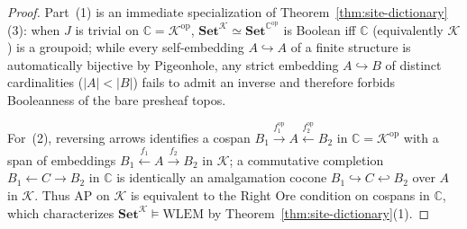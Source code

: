 \documentclass[10pt,twoside,openright]{book}
\theoremstyle{crmplain}
\theoremstyle{crmdef}
\theoremstyle{crmremark}
\begin{document}
\begin{proof}
Part~(1) is an immediate specialization of Theorem~\ref{thm:site-dictionary}(3): when $J$ is trivial on $\mathbb{C} = \mathcal{K}^{\mathrm{op}}$, $\mathbf{Set}^{\mathcal{K}} \simeq \mathbf{Set}^{\mathbb{C}^{\mathrm{op}}}$ is Boolean iff $\mathbb{C}$ (equivalently $\mathcal{K}$) is a groupoid; while every self-embedding $A \hookrightarrow A$ of a finite structure is automatically bijective by Pigeonhole, any strict embedding $A \hookrightarrow B$ of distinct cardinalities ($|A| < |B|$) fails to admit an inverse and therefore forbids Booleanness of the bare presheaf topos.

For~(2), reversing arrows identifies a cospan $B_1 \xrightarrow{f_1^{\mathrm{op}}} A \xleftarrow{f_2^{\mathrm{op}}} B_2$ in $\mathbb{C} = \mathcal{K}^{\mathrm{op}}$ with a span of embeddings $B_1 \xleftarrow{f_1} A \xrightarrow{f_2} B_2$ in $\mathcal{K}$; a commutative completion $B_1 \leftarrow C \rightarrow B_2$ in $\mathbb{C}$ is identically an amalgamation cocone $B_1 \hookrightarrow C \hookleftarrow B_2$ over $A$ in $\mathcal{K}$. Thus $\mathrm{AP}$ on $\mathcal{K}$ is equivalent to the Right Ore condition on cospans in $\mathbb{C}$, which characterizes $\mathbf{Set}^{\mathcal{K}} \models \mathrm{WLEM}$ by Theorem~\ref{thm:site-dictionary}(1).


\end{proof}
\end{document}
